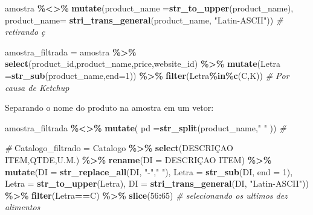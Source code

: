 \documentclass[
]{article}
\newenvironment{Shaded}{\begin{snugshade}}{\end{snugshade}}
\newcommand{\CommentTok}[1]{\textcolor[rgb]{0.56,0.35,0.01}{\textit{#1}}}
\newcommand{\DataTypeTok}[1]{\textcolor[rgb]{0.13,0.29,0.53}{#1}}
\newcommand{\DecValTok}[1]{\textcolor[rgb]{0.00,0.00,0.81}{#1}}
\newcommand{\KeywordTok}[1]{\textcolor[rgb]{0.13,0.29,0.53}{\textbf{#1}}}
\newcommand{\NormalTok}[1]{#1}
\newcommand{\OperatorTok}[1]{\textcolor[rgb]{0.81,0.36,0.00}{\textbf{#1}}}
\newcommand{\StringTok}[1]{\textcolor[rgb]{0.31,0.60,0.02}{#1}}
\begin{document}
\begin{Shaded}
\begin{Highlighting}[]
\NormalTok{amostra }\OperatorTok{\%\textless{}\textgreater{}\%}\StringTok{ }\KeywordTok{mutate}\NormalTok{(}\DataTypeTok{product\_name =}\KeywordTok{str\_to\_upper}\NormalTok{(product\_name),}
\DataTypeTok{product\_name=} \KeywordTok{stri\_trans\_general}\NormalTok{(product\_name, }\StringTok{"Latin{-}ASCII"}\NormalTok{)) }\CommentTok{\# retirando ç}


\NormalTok{amostra\_filtrada =}\StringTok{ }\NormalTok{amostra }\OperatorTok{\%\textgreater{}\%}\StringTok{ }
\KeywordTok{select}\NormalTok{(product\_id,product\_name,price,website\_id) }\OperatorTok{\%\textgreater{}\%}\StringTok{ }
\KeywordTok{mutate}\NormalTok{(}\DataTypeTok{Letra =}\KeywordTok{str\_sub}\NormalTok{(product\_name,}\DataTypeTok{end=}\DecValTok{1}\NormalTok{)) }\OperatorTok{\%\textgreater{}\%}
\KeywordTok{filter}\NormalTok{(Letra}\OperatorTok{\%in\%}\KeywordTok{c}\NormalTok{(}\StringTok{\textquotesingle{}C\textquotesingle{}}\NormalTok{,}\StringTok{\textquotesingle{}K\textquotesingle{}}\NormalTok{))  }\CommentTok{\# Por causa de Ketchup}
\end{Highlighting}
\end{Shaded}

Separando o nome do produto na amostra em um vetor:

\begin{Shaded}
\begin{Highlighting}[]
\NormalTok{amostra\_filtrada }\OperatorTok{\%\textless{}\textgreater{}\%}\StringTok{ }\KeywordTok{mutate}\NormalTok{( }\DataTypeTok{pd =}\KeywordTok{str\_split}\NormalTok{(product\_name,}\StringTok{" "}\NormalTok{ )) }\CommentTok{\# }

\CommentTok{\#}
\NormalTok{Catalogo\_filtrado =}\StringTok{ }
\StringTok{    }\NormalTok{Catalogo }\OperatorTok{\%\textgreater{}\%}\StringTok{ }\KeywordTok{select}\NormalTok{(}\StringTok{\textasciigrave{}}\DataTypeTok{DESCRIÇAO ITEM}\StringTok{\textasciigrave{}}\NormalTok{,QTDE,U.M.) }\OperatorTok{\%\textgreater{}\%}\StringTok{  }\KeywordTok{rename}\NormalTok{(}\DataTypeTok{DI =} \StringTok{\textasciigrave{}}\DataTypeTok{DESCRIÇAO ITEM}\StringTok{\textasciigrave{}}\NormalTok{) }\OperatorTok{\%\textgreater{}\%}
\StringTok{  }\KeywordTok{mutate}\NormalTok{(}\DataTypeTok{DI =} \KeywordTok{str\_replace\_all}\NormalTok{(DI, }\StringTok{"{-}"}\NormalTok{,}\StringTok{" "}\NormalTok{),}
        \DataTypeTok{Letra =} \KeywordTok{str\_sub}\NormalTok{(DI, }\DataTypeTok{end =} \DecValTok{1}\NormalTok{),}
         \DataTypeTok{Letra =} \KeywordTok{str\_to\_upper}\NormalTok{(Letra),}
         \DataTypeTok{DI =} \KeywordTok{stri\_trans\_general}\NormalTok{(DI, }\StringTok{"Latin{-}ASCII"}\NormalTok{)) }\OperatorTok{\%\textgreater{}\%}\StringTok{ }\KeywordTok{filter}\NormalTok{(Letra}\OperatorTok{==}\StringTok{\textquotesingle{}C\textquotesingle{}}\NormalTok{) }\OperatorTok{\%\textgreater{}\%}\StringTok{ }
\StringTok{  }\KeywordTok{slice}\NormalTok{(}\DecValTok{56}\OperatorTok{:}\DecValTok{65}\NormalTok{) }\CommentTok{\# selecionando os ultimos dez alimentos}
\end{Highlighting}
\end{Shaded}
\end{document}
